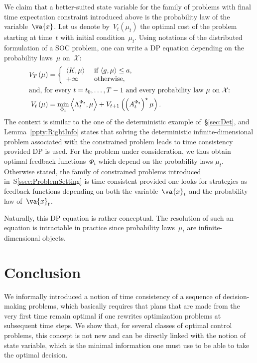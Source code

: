 \documentclass[a4paper]{amsart}
\theoremstyle{plain}
\theoremstyle{definition}
\theoremstyle{remark}
\begin{document}
We claim that a better-suited state variable for the family of
problems with final time expectation constraint introduced above
is the probability law of the variable~$\va{x}$. Let us denote
by~$V_t(\mu_t)$ the optimal cost of the problem starting at
time~$t$ with initial condition~$\mu_t$. Using notations of the
distributed formulation of a SOC problem, one can write a DP
equation depending on the probability laws~$\mu$ on~$\mathcal{X}$:
\begin{align*}
V_T\left(\mu\right)
    & = \left\{ \begin{array}{ll}
           \left\langle K, \mu \right\rangle &
           \text{ if $\left\langle g, \mu \right\rangle \leq a$}, \\
           +\infty & \text{ otherwise},
        \end{array} \right. \\
\intertext{and, for every~$t=t_0, \dots, T-1$ and every
probability law~$\mu$ on~$\mathcal{X}$:} V_t\left(\mu\right)
    &=\min_{\Phi_t} \left\langle \Lambda_t^{\Phi_t}, \mu \right\rangle +
     V_{t+1}\left(\left(A_t^{\Phi_t}\right)^\star \mu\right).
\end{align*}
The context is similar to the one of the deterministic example
of~\S\ref{sec:Det}, and Lemma~\ref{ppty:RightInfo} states that
solving the deterministic infinite-dimensional problem associated
with the constrained problem leads to time consistency provided DP
is used. For the problem under consideration, we thus obtain
optimal feedback functions~$\Phi_{t}$ which depend on the
probability laws $\mu_{t}$. Otherwise stated, the family of
constrained problems introduced in~S\ref{ssec:ProblemSetting} is
time consistent provided one looks for strategies as feedback
functions depending on both the variable~$\va{x}_{t}$ and the
probability law of~$\va{x}_{t}$.

Naturally, this DP equation is rather conceptual. The resolution
of such an equation is intractable in practice since probability
laws~$\mu_t$ are infinite-dimensional objects.

\section{Conclusion}

We informally introduced a notion of time consistency of a
sequence of decision-making problems, which basically requires
that plans that are made from the very first time remain optimal
if one rewrites optimization problems at subsequent time steps. We
show that, for several classes of optimal control problems, this
concept is not new and can be directly linked with the notion of
state variable, which is the minimal information one must use to
be able to take the optimal decision.
\end{document}
